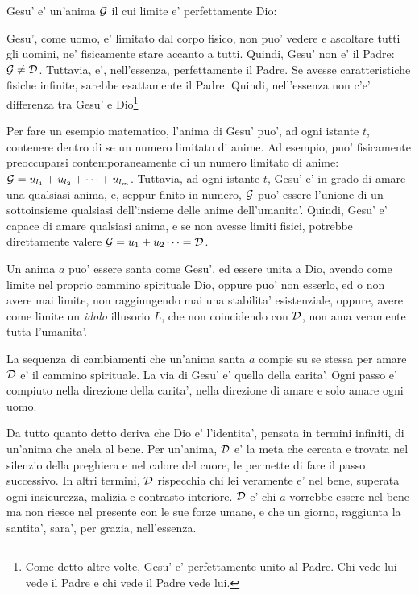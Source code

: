 
Gesu' e' un'anima $\mathcal{G}$ il cui limite e' perfettamente Dio:

Gesu', come uomo, e' limitato dal corpo fisico, non puo' vedere e ascoltare tutti gli uomini, ne' fisicamente stare accanto a tutti. Quindi, Gesu' non e' il Padre: $\mathcal{G}\neq \mathcal{D}$. Tuttavia, e', nell'essenza, perfettamente il Padre. Se avesse caratteristiche fisiche infinite, sarebbe esattamente il Padre. Quindi, nell'essenza non c'e' differenza tra Gesu' e Dio\footnote{Come detto altre volte, Gesu' e' perfettamente unito al Padre. Chi vede lui vede il Padre e chi vede il Padre vede lui.}

Per fare un esempio matematico, l'anima di Gesu' puo', ad ogni istante $t$, contenere dentro di se un numero limitato di anime. Ad esempio, puo' fisicamente preoccuparsi contemporaneamente di un numero limitato di anime: $\mathcal{G}=u_{l_1}+u_{l_2}+\cdots+u_{l_m}$. Tuttavia, ad ogni istante $t$, Gesu' e' in grado di amare una qualsiasi anima, e, seppur finito in numero, $\mathcal{G}$ puo' essere l'unione di un sottoinsieme qualsiasi dell'insieme delle anime dell'umanita'. Quindi, Gesu' e' capace di amare qualsiasi anima, e se non avesse limiti fisici, potrebbe direttamente valere $\mathcal{G}=u_1+u_2\cdots=\mathcal{D}$.

Un anima $a$ puo' essere santa come Gesu', ed essere unita a Dio, avendo come limite nel proprio cammino spirituale Dio, oppure puo' non esserlo, ed o non avere mai limite, non raggiungendo mai una stabilita' esistenziale, oppure, avere come limite un \emph{idolo} illusorio $L$, che non coincidendo con $\mathcal{D}$, non ama veramente tutta l'umanita'.

La sequenza di cambiamenti che un'anima santa $a$ compie su se stessa per amare $\mathcal{D}$ e' il cammino spirituale. La via di Gesu' e' quella  della carita'. Ogni passo e' compiuto nella direzione della carita', nella direzione di amare e solo amare ogni uomo.

Da tutto quanto detto deriva che Dio e' l'identita', pensata in termini infiniti, di un'anima che anela al bene.
Per un'anima, $\mathcal{D}$ e' la meta che cercata e trovata nel silenzio della preghiera e nel calore del cuore, le permette di fare il passo successivo. In altri termini, $\mathcal{D}$ rispecchia chi lei veramente e' nel bene, superata ogni insicurezza, malizia e contrasto interiore. $\mathcal{D}$ e' chi $a$ vorrebbe essere nel bene ma non riesce nel presente con le sue forze umane, e che un giorno, raggiunta la santita', sara', per grazia, nell'essenza.

